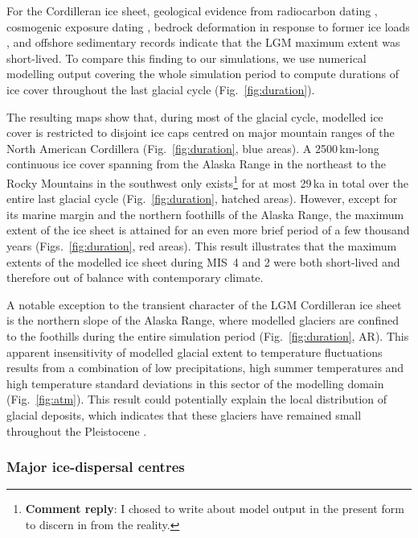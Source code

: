 \documentclass[tc, manuscript]{copernicus}
\newcommand{\renote}[1]{\footnote{\textbf{Comment reply}: #1}}
\begin{document}
For the Cordilleran ice sheet, geological evidence from radiocarbon dating
    \citep{Clague.etal.1980, Clague.1985, Clague.1986, Porter.Swanson.1998,
           Menounos.etal.2008},
cosmogenic exposure dating
    \citep{Stroeven.etal.2010, Stroeven.etal.2014, Margold.etal.2014},
bedrock deformation in response to former ice loads
    \citep{Clague.James.2002, Clague.etal.2005},
and offshore sedimentary records
    \citep{Cosma.etal.2008, Davies.etal.2011}
indicate that the LGM maximum extent was short-lived. To compare this finding
to our simulations, we use numerical modelling output covering the whole
simulation period to compute durations of ice cover throughout the last glacial
cycle (Fig.~\ref{fig:duration}).

The resulting maps show that, during most of the glacial cycle, modelled ice
cover is restricted to disjoint ice caps centred on major mountain ranges of
the North American Cordillera (Fig.~\ref{fig:duration}, blue areas). A
2500\,km-long continuous ice cover spanning from the Alaska Range in the
northeast to the Rocky Mountains in the southwest only exists\renote{
    I chosed to write about model output in the present form to discern in from
    the reality.}
for at most 29\,ka in total over the entire last glacial cycle
(Fig.~\ref{fig:duration}, hatched areas). However,
except for its marine margin and the northern foothills of the Alaska Range,
the maximum extent of the ice sheet is attained for an even more brief period
of a few thousand years (Figs.~\ref{fig:duration}, red areas). This
result illustrates that the maximum extents of the modelled ice sheet during
MIS~4 and 2 were both short-lived and therefore out of balance with
contemporary climate.

A notable exception to the transient character of the LGM Cordilleran ice sheet
is the northern slope of the Alaska Range, where modelled glaciers are confined
to the foothills during the entire simulation period (Fig.~\ref{fig:duration},
AR). This apparent insensitivity of modelled glacial extent to temperature
fluctuations results from a combination of low precipitations, high summer
temperatures and high temperature standard deviations in this sector of the
modelling domain (Fig.~\ref{fig:atm}). This result could potentially explain
the local distribution of glacial deposits, which indicates that these glaciers
have remained small throughout the Pleistocene \citep{Kaufman.Manley.2004}.

\subsubsection{Major ice-dispersal centres}
\end{document}
